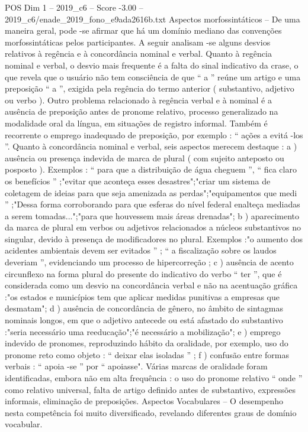 \begin{textsample}{POS Dim 1 – 2019\_c6 – Score -3.00 – 2019\_c6/enade\_2019\_fono\_e9ada2616b.txt}
Aspectos morfossintáticos – De uma maneira geral, pode -se afirmar que há um domínio mediano das convenções morfossintáticas pelos participantes.
A seguir analisam -se alguns desvios relativos à regência e à concordância nominal e verbal.
Quanto à regência nominal e verbal, o desvio mais frequente é a falta do sinal indicativo da crase, o que revela que o usuário não tem consciência de que “ a ” reúne um artigo e uma preposição “ a ”, exigida pela regência do termo anterior ( substantivo, adjetivo ou verbo ).
Outro problema relacionado à regência verbal e à nominal é a ausência de preposição antes de pronome relativo, processo generalizado na modalidade oral da língua, em situações de registro informal.
Também é recorrente o emprego inadequado de preposição, por exemplo : “ ações a evitá -los ”.
Quanto à concordância nominal e verbal, seis aspectos merecem destaque : a ) ausência ou presença indevida de marca de plural ( com sujeito anteposto ou posposto ).
Exemplos : “ para que a distribuição de água cheguem ”, “ fica claro os benefícios ” ;"evitar que aconteça esses desastres";"criar um sistema de coletagem de ideias para que seja amenizada as perdas";"equipamentos que medi ” ;"Dessa forma corroborando para que esferas do nível federal enalteça mediadas a serem tomadas...";"para que houvessem mais áreas drenadas"; b ) aparecimento da marca de plural em verbos ou adjetivos relacionados a núcleos substantivos no singular, devido à presença de modificadores no plural.
Exemplos :"o aumento dos acidentes ambientais devem ser evitados ” ; “ a fiscalização sobre os laudos deveriam ”, evidenciando um processo de hipercorreção ; c ) ausência de acento circunflexo na forma plural do presente do indicativo do verbo “ ter ”, que é considerada como um desvio na concordância verbal e não na acentuação gráfica :"os estados e municípios tem que aplicar medidas punitivas a empresas que desmatam"; d ) ausência de concordância de gênero, no âmbito de sintagmas nominais longos, em que o adjetivo antecede ou está afastado do substantivo :"seria necessário uma reeducação";"é necessário a mobilização"; e ) emprego indevido de pronomes, reproduzindo hábito da oralidade, por exemplo, uso do pronome reto como objeto : “ deixar elas isoladas ” ; f ) confusão entre formas verbais : “ apoia -se ” por “ apoiasse".
Várias marcas de oralidade foram identificadas, embora não em alta frequência : o uso do pronome relativo “ onde ” como relativo universal, falta de artigo definido antes de substantivo, expressões informais, eliminação de preposições.
Aspectos Vocabulares – O desempenho nesta competência foi muito diversificado, revelando diferentes graus de domínio vocabular.

\end{textsample}

